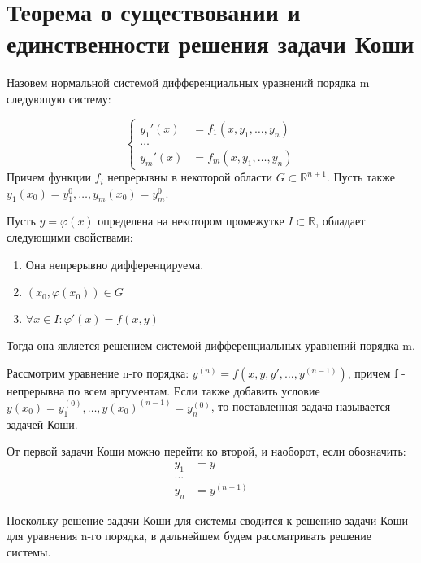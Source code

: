 \documentclass[document.tex]{subfiles}
\begin{document}
\section{Теорема о существовании и единственности решения задачи Коши}
\begin{definition}
Назовем нормальной системой дифференциальных уравнений порядка m следующую систему:

$$\left\{
\begin{aligned}y_1'(x) &= f_1(x, y_1, \ldots, y_n)\\
\ldots \\
y_m'(x) &= f_m(x, y_1, \ldots, y_n)
\end{aligned}
\right.$$
Причем функции $f_i$ непрерывны в некоторой области $G \subset \mathbb{R}^{n+1}$. Пусть также $y_1(x_0) = y_1^0, \ldots, y_m(x_0) = y_m^0$.
\end{definition}

\begin{definition}
Пусть $y = \varphi(x)$ определена на некотором промежутке $I \subset \mathbb{R}$, обладает следующими свойствами:
\begin{enumerate}
\item Она непрерывно дифференцируема.
\item $(x_0, \varphi(x_0)) \in G$
\item $\forall x \in I: \varphi'(x) = f(x, y)$
\end{enumerate}
Тогда она является решением системой дифференциальных уравнений порядка m.
\end{definition}

\begin{example}
Рассмотрим уравнение n-го порядка:
$y^{(n)} = f(x, y, y', \ldots, y^{(n-1)})$, причем f - непрерывна по всем аргументам.
Если также добавить условие $y(x_0) = y_1^{(0)}, \ldots, y(x_0)^{(n-1)} = y_n^{(0)}$, то поставленная задача называется задачей Коши.
\end{example}

\begin{remark}
От первой задачи Коши можно перейти ко второй, и наоборот, если обозначить:
$$\begin{aligned}y_1 &= y\\
...\\
y_n &= y^{(n-1)}
\end{aligned}$$
\end{remark}

\begin{remark}
Поскольку решение задачи Коши для системы сводится к решению задачи Коши для уравнения n-го порядка, в дальнейшем будем рассматривать решение системы.
\end{remark}
\end{document}
